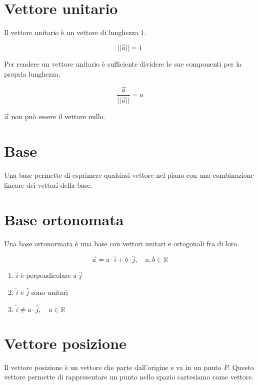 \documentclass{article}
\begin{document}
\section{Vettore unitario}

Il vettore unitario è un vettore di lunghezza \(1\).

\[
    ||\hat{a}|| = 1
\]

Per rendere un vettore unitario è sufficiente dividere le sue componenti per la propria lunghezza.

\[
    \frac{\vec{a}}{||\vec{a}||}=\hat{a}
\]

\(\vec{a}\) non può essere il vettore nullo.

\section{Base}

Una base permette di esprimere qualsiasi vettore nel piano con una combinazione lineare dei vettori della base.

\section{Base ortonomata}

Una base ortonormata è una base con vettori unitari e ortogonali fra di loro.

\[
    \vec{a} = a \cdot \hat{i} + b \cdot \hat{j},
    \quad a,b \in \mathbb{R}
\]

\begin{enumerate}
    \item \(\hat{i}\) è perpendicolare a \(\hat{j}\)
    \item \(\hat{i}\) e \(\hat{j}\) sono unitari
    \item \(\hat{i} \neq a\cdot\hat{j},\quad a\in \mathbb{R}\)  
\end{enumerate}

\section{Vettore posizione}

Il vettore posizione è un vettore che parte dall'origine e va in un punto \(P\).
Questo vettore permette di rappresentare un punto nello spazio cartesiamo come vettore.

\pagebreak
\end{document}
